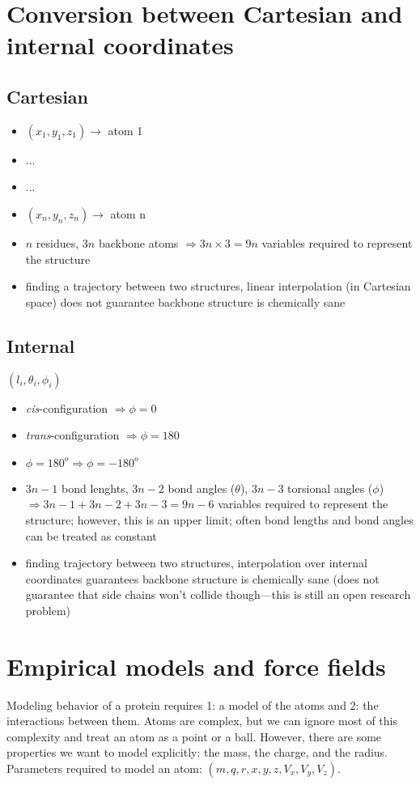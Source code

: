 \documentclass[10pt]{article}
\newenvironment{mitemize}
{
  \begin{itemize}
  \setlength{\itemsep}{1pt}
  \setlength{\parskip}{0pt}
  \setlength{\parsep}{0pt}}{\end{itemize}
}
\begin{document}
\section*{Conversion between Cartesian and internal coordinates}

\subsection*{Cartesian}
\begin{mitemize}
  \item $(x_1, y_1, z_1) \rightarrow$ atom 1
  \item ...
  \item ...
  \item $(x_n, y_n, z_n) \rightarrow$ atom n
  \item $n$ residues, $3n$ backbone atoms $\Rightarrow 3n \times 3 = 9n$ variables required to represent the structure
  \item finding a trajectory between two structures, linear interpolation (in Cartesian space) does not guarantee backbone structure is chemically sane
\end{mitemize}

\subsection*{Internal}
$(l_i, \theta_i, \phi_i)$

\begin{mitemize}
  \item \textit{cis}-configuration $\Rightarrow \phi = 0$
  \item \textit{trans}-configuration $\Rightarrow \phi = 180$
  \item $\phi = 180^{o} \Rightarrow \phi = -180^{o}$
  \item $3n - 1$ bond lenghts, $3n - 2$ bond angles ($\theta$), $3n-3$ torsional angles ($\phi$) $\Rightarrow 3n - 1 + 3n - 2 + 3n - 3 = 9n - 6$ variables required to represent the structure; however, this is an upper limit; often bond lengths and bond angles can be treated as constant
  \item finding trajectory between two structures, interpolation over internal coordinates guarantees backbone structure is chemically sane (does not guarantee that side chains won't collide though---this is still an open research problem)
\end{mitemize}

\section*{Empirical models and force fields}
Modeling behavior of a protein requires 1: a model of the atoms and 2: the interactions between them. Atoms are complex, but we can ignore most of this complexity and treat an atom as a point or a ball. However, there are some properties we want to model explicitly: the mass, the charge, and the radius. Parameters required to model an atom: $(m, q, r, x, y, z, V_x, V_y, V_z)$.
\end{document}
